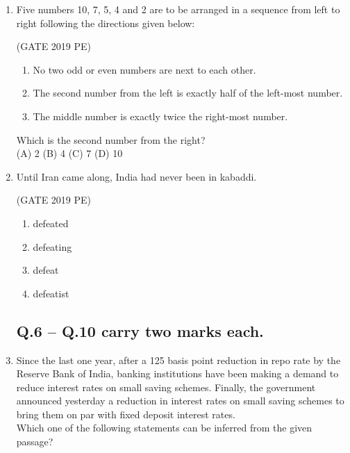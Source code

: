 \documentclass[journal,12pt,onecolumn]{exam}
\theoremstyle{remark}
\begin{document}
\begin{enumerate}
    \item Five numbers 10, 7, 5, 4 and 2 are to be arranged in a sequence from left to right following the directions given below:
    
\hfill{(GATE 2019 PE)}\\
    \begin{enumerate}
        \item No two odd or even numbers are next to each other.
        \item The second number from the left is exactly half of the left-most number.
        \item The middle number is exactly twice the right-most number.
    \end{enumerate}
    Which is the second number from the right?\\[2pt]
    (A) 2 \hspace{1cm} (B) 4 \hspace{1cm} (C) 7 \hspace{1cm} (D) 10

    \item Until Iran came along, India had never been in kabaddi.
    
    \hfill{(GATE 2019 PE)}\\
    \begin{enumerate}
        \item defeated
        \item defeating
        \item defeat
        \item defeatist
    \end{enumerate}
\subsection*{Q.6 -- Q.10 carry two marks each.}
 \item Since the last one year, after a 125 basis point reduction in repo rate by the Reserve Bank of India, banking institutions have been making a demand to reduce interest rates on small saving schemes. Finally, the government announced yesterday a reduction in interest rates on small saving schemes to bring them on par with fixed deposit interest rates.\\
    Which one of the following statements can be inferred from the given passage?\\


\end{enumerate}
\end{document}
